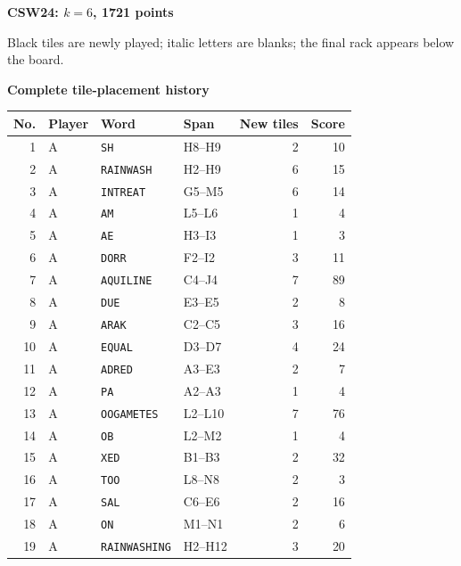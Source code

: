 \documentclass[letterpaper]{article}
\begin{document}
\vfill
\clearpage
\begin{center}
{\fontsize{11}{12}\selectfont\bfseries CSW24: $k=6$, 1721 points\par}
\vspace{2pt}
\par
\vspace{1pt}
{\fontsize{7.2}{8}\selectfont Black tiles are newly played; italic letters are blanks; the final rack appears below the board.\par}
\vspace{2pt}
{\fontsize{8.5}{9}\selectfont\bfseries Complete tile-placement history\par}
\end{center}
\begin{center}
\fontsize{8}{8.15}\selectfont
\setlength{\tabcolsep}{4pt}
\renewcommand{\arraystretch}{0.80}
\begin{tabular}{@{}rlllrr@{}}\toprule
No. & Player & Word & Span & New tiles & Score\\
\midrule
1 & A & \texttt{SH} & H8--H9 & 2 & 10\\
2 & A & \texttt{RAINWASH} & H2--H9 & 6 & 15\\
3 & A & \texttt{INTREAT} & G5--M5 & 6 & 14\\
4 & A & \texttt{AM} & L5--L6 & 1 & 4\\
5 & A & \texttt{AE} & H3--I3 & 1 & 3\\
6 & A & \texttt{DORR} & F2--I2 & 3 & 11\\
7 & A & \texttt{AQUILINE} & C4--J4 & 7 & 89\\
8 & A & \texttt{DUE} & E3--E5 & 2 & 8\\
9 & A & \texttt{ARAK} & C2--C5 & 3 & 16\\
10 & A & \texttt{EQUAL} & D3--D7 & 4 & 24\\
11 & A & \texttt{ADRED} & A3--E3 & 2 & 7\\
12 & A & \texttt{PA} & A2--A3 & 1 & 4\\
13 & A & \texttt{OOGAMETES} & L2--L10 & 7 & 76\\
14 & A & \texttt{OB} & L2--M2 & 1 & 4\\
15 & A & \texttt{XED} & B1--B3 & 2 & 32\\
16 & A & \texttt{TOO} & L8--N8 & 2 & 3\\
17 & A & \texttt{SAL} & C6--E6 & 2 & 16\\
18 & A & \texttt{ON} & M1--N1 & 2 & 6\\
19 & A & \texttt{RAINWASHING} & H2--H12 & 3 & 20\\

\end{tabular}
\end{center}
\end{document}

